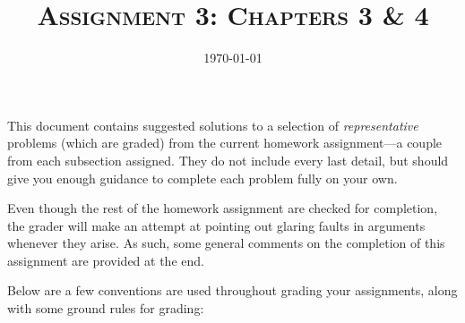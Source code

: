 \documentclass{amsart}
\title{\textsc{Assignment 3: Chapters 3 \& 4}}
\date{\today}
\theoremstyle{definition}
\theoremstyle{definition}
\DeclareMathOperator{\1}{\mathbbm{1}}
\begin{document}
	\sloppy
	\maketitle
	
	
	This document contains suggested solutions to a selection of \textit{representative} problems (which are graded) from the current homework assignment---a couple from each subsection assigned. They do not include every last detail, but should give you enough guidance to complete each problem fully on your own. 
	
	Even though the rest of the homework assignment are checked for completion, the grader will make an attempt at pointing out glaring faults in arguments whenever they arise. As such, some general comments on the completion of this assignment are provided at the end. 
	
	Below are a few conventions are used throughout grading your assignments, along with some ground rules for grading:
	
\end{document}
